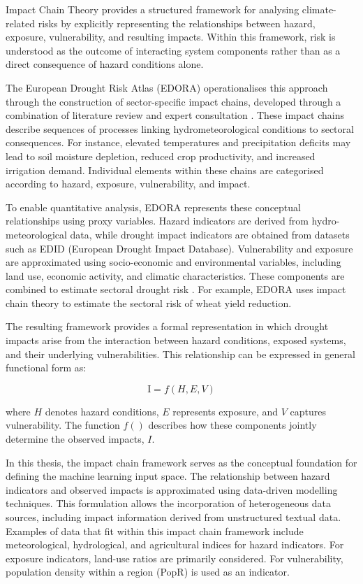 Impact Chain Theory provides a structured framework for analysing climate-related risks by explicitly representing the relationships between hazard, exposure, vulnerability, and resulting impacts. Within this framework, risk is understood as the outcome of interacting system components rather than as a direct consequence of hazard conditions alone.

The European Drought Risk Atlas (EDORA) operationalises this approach through the construction of sector-specific impact chains, developed through a combination of literature review and expert consultation \cite{EDORA}. These impact chains describe sequences of processes linking hydrometeorological conditions to sectoral consequences. For instance, elevated temperatures and precipitation deficits may lead to soil moisture depletion, reduced crop productivity, and increased irrigation demand. Individual elements within these chains are categorised according to hazard, exposure, vulnerability, and impact.

To enable quantitative analysis, EDORA represents these conceptual relationships using proxy variables. Hazard indicators are derived from hydro-meteorological data, while drought impact indicators are obtained from datasets such as EDID (European Drought Impact Database). Vulnerability and exposure are approximated using socio-economic and environmental variables, including land use, economic activity, and climatic characteristics. These components are combined to estimate sectoral drought risk \cite{EDORA}. For example, EDORA uses impact chain theory to estimate the sectoral risk of wheat yield reduction. 

The resulting framework provides a formal representation in which drought impacts arise from the interaction between hazard conditions, exposed systems, and their underlying vulnerabilities. This relationship can be expressed in general functional form as:

\[
\text{I} = f(H, E, V)
\]

where $H$ denotes hazard conditions, $E$ represents exposure, and $V$ captures vulnerability. The function $f()$ describes how these components jointly determine the observed impacts, $I$.

In this thesis, the impact chain framework serves as the conceptual foundation for defining the machine learning input space. The relationship between hazard indicators and observed impacts is approximated using data-driven modelling techniques. This formulation allows the incorporation of heterogeneous data sources, including impact information derived from unstructured textual data. Examples of data that fit within this impact chain framework include meteorological, hydrological, and agricultural indices for hazard indicators. For exposure indicators, land-use ratios are primarily considered. For vulnerability, population density within a region (PopR) is used as an indicator.
